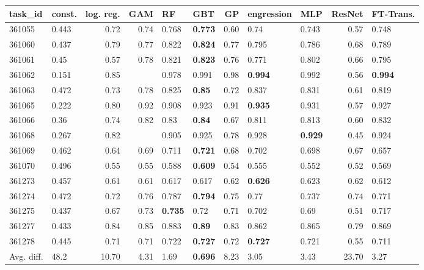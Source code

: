 \begin{table}[ht!]
\centering
\begingroup\footnotesize
\begin{tabular}{llrrllrllrl}
  \hline
\hline
task\_id & const. & log. reg. & GAM & RF & GBT & GP & engression & MLP & ResNet & FT-Trans. \\ 
  \hline
361055 & 0.443 & 0.72 & 0.74 & 0.768 & \textbf{0.773} & 0.60 & 0.74 & 0.743 & 0.57 & 0.748 \\ 
  361060 & 0.437 & 0.79 & 0.77 & 0.822 & \textbf{0.824} & 0.77 & 0.795 & 0.786 & 0.68 & 0.789 \\ 
  361061 & 0.45 & 0.57 & 0.78 & 0.821 & \textbf{0.823} & 0.76 & 0.771 & 0.802 & 0.66 & 0.795 \\ 
  361062 & 0.151 & 0.85 &  & 0.978 & 0.991 & 0.98 & \textbf{0.994} & 0.992 & 0.56 & \textbf{0.994} \\ 
  361063 & 0.472 & 0.73 & 0.78 & 0.825 & \textbf{0.85} & 0.72 & 0.837 & 0.831 & 0.61 & 0.819 \\ 
  361065 & 0.222 & 0.80 & 0.92 & 0.908 & 0.923 & 0.91 & \textbf{0.935} & 0.931 & 0.57 & 0.927 \\ 
  361066 & 0.36 & 0.74 & 0.82 & 0.83 & \textbf{0.84} & 0.67 & 0.811 & 0.813 & 0.60 & 0.832 \\ 
  361068 & 0.267 & 0.82 &  & 0.905 & 0.925 & 0.78 & 0.928 & \textbf{0.929} & 0.45 & 0.924 \\ 
  361069 & 0.462 & 0.64 & 0.69 & 0.711 & \textbf{0.721} & 0.68 & 0.702 & 0.698 & 0.67 & 0.657 \\ 
  361070 & 0.496 & 0.55 & 0.55 & 0.588 & \textbf{0.609} & 0.54 & 0.555 & 0.552 & 0.52 & 0.569 \\ 
  361273 & 0.457 & 0.61 & 0.61 & 0.617 & 0.617 & 0.62 & \textbf{0.626} & 0.623 & 0.62 & 0.612 \\ 
  361274 & 0.472 & 0.72 & 0.76 & 0.787 & \textbf{0.794} & 0.75 & 0.77 & 0.737 & 0.74 & 0.771 \\ 
  361275 & 0.437 & 0.67 & 0.73 & \textbf{0.735} & 0.72 & 0.71 & 0.702 & 0.69 & 0.51 & 0.717 \\ 
  361277 & 0.433 & 0.84 & 0.85 & 0.883 & \textbf{0.89} & 0.83 & 0.862 & 0.865 & 0.79 & 0.869 \\ 
  361278 & 0.445 & 0.71 & 0.71 & 0.722 & \textbf{0.727} & 0.72 & \textbf{0.727} & 0.721 & 0.55 & 0.711 \\ 
   \hline
Avg. diff. & 48.2 & 10.70 & 4.31 & 1.69 & \textbf{0.696} & 8.23 & 3.05 & 3.43 & 23.70 & 3.27 \\ 

\end{tabular}
\end{table}
